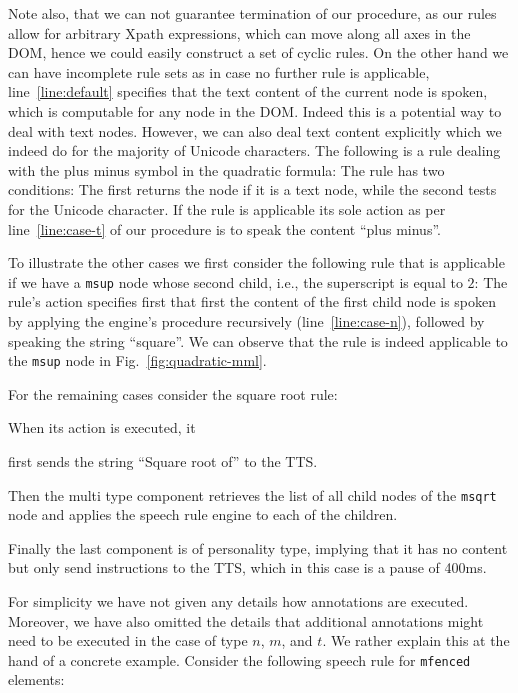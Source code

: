 \documentclass{sig-alternate}
\begin{document}
Note also, that we can not guarantee termination of our procedure, as our rules
allow for arbitrary Xpath expressions, which can move along all axes in the DOM,
hence we could easily construct a set of cyclic rules. On the other hand we can
have incomplete rule sets as in case no further rule is applicable,
line~\ref{line:default} specifies that the text content of the current node is
spoken, which is computable for any node in the DOM. Indeed this is a potential
way to deal with text nodes. However, we can also deal text content explicitly
which we indeed do for the majority of Unicode characters.  The following is a
rule dealing with the plus minus symbol in the quadratic formula:
 The rule has two
conditions: The first returns the node if it is a text node, while the second
tests for the Unicode character. If the rule is applicable its sole action as
per line~\ref{line:case-t} of our procedure is to speak the content
``plus minus''.

To illustrate the other cases we first consider the following rule that is
applicable if we have a \texttt{msup} node whose second child, i.e., the superscript is
equal to $2$:  The rule's action specifies first that first the content of the
first child node is spoken by applying the engine's procedure recursively
(line~\ref{line:case-n}), followed by speaking the string ``square''.  We can
observe that the rule is indeed applicable to the \texttt{msup} node in
Fig.~\ref{fig:quadratic-mml}.

For the remaining cases  consider the square root rule:

\noindent When its action is executed, it
\begin{inparaenum}[(1)]
\item first sends the string ``Square root of'' to the TTS.
\item Then the multi type component retrieves the list of all child nodes of the
  \texttt{msqrt} node and applies the speech rule engine to each of the children.
\item Finally the last component is of personality type, implying that it
  has no content but only send instructions to the TTS, which in this case is a
  pause of 400ms.
\end{inparaenum}

For simplicity we have not given any details how annotations are executed.
Moreover, we have also omitted the details that additional annotations might
need to be executed in the case of type $n$, $m$, and $t$. We rather explain
this at the hand of a concrete example. Consider the following speech rule for
\texttt{mfenced} elements:
\end{document}
